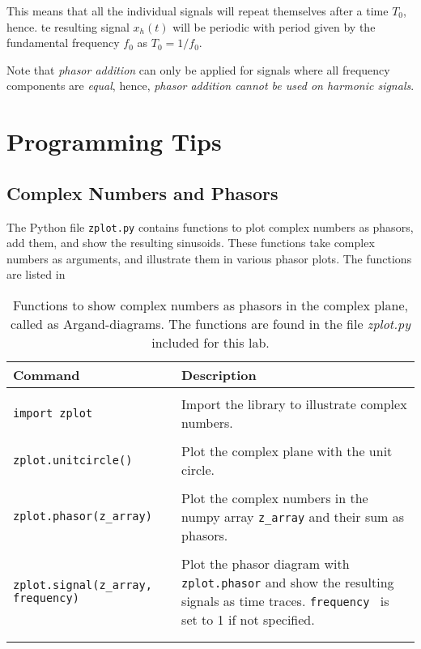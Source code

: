 This means that all the individual signals will repeat themselves after a time $T_0$, hence. te resulting signal $x_h(t)$ will be periodic with period given by the fundamental frequency $f_0$ as $T_0=1/f_0$.

Note that \emph{phasor addition} can only be applied for signals where all frequency components are \emph{equal}, hence, \emph{phasor addition cannot be used on harmonic signals}.

\section{Programming Tips}

\subsection{Complex Numbers and Phasors}
The Python file \verb|zplot.py| contains functions to plot complex numbers as phasors, add them, and show the resulting sinusoids. These functions take complex numbers as arguments, and illustrate them in various phasor plots. The functions are listed in 

\begin{table}
	\caption{Functions to show complex numbers as phasors in the complex plane, called as Argand-diagrams. The functions are found in the file \emph{zplot.py} included for this lab. }
	\label{tab:zplot}
	\begin{tabularx}{\textwidth}{lX}
		\\
		Command					& Description		\\
		\hline \\
		\verb|import zplot| & 
		\multicolumn{1}{l}{Import the library to illustrate complex numbers. } \\
		\\
		\verb|zplot.unitcircle()|		& Plot the complex plane with the unit circle. \\ \\
		\verb|zplot.phasor(z_array)|  	& Plot the complex numbers in the numpy array \verb|z_array| and their sum as phasors. \\ \\
		\verb|zplot.signal(z_array, frequency)|  	& Plot the phasor diagram with \verb|zplot.phasor| and show the resulting signals as time traces. \verb|frequency | is set to \num{1} if not specified. \\
		\\
		\hline \\
	\end{tabularx}
	
\end{table}


